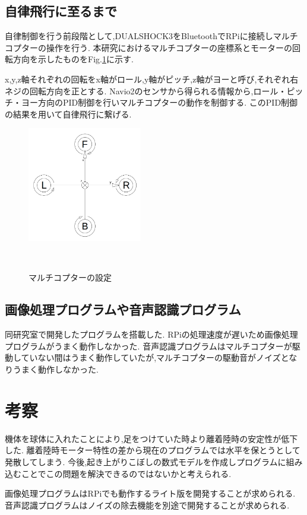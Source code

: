 \documentclass[a4paper]{jarticle}
\begin{document}
\subsection{自律飛行に至るまで}
自律制御を行う前段階として,DUALSHOCK3をBluetoothでRPiに接続しマルチコプターの操作を行う.
本研究におけるマルチコプターの座標系とモーターの回転方向を示したものをFig.\ref{fig:config}に示す.

x,y,z軸それぞれの回転をx軸がロール,y軸がピッチ,z軸がヨーと呼び,それぞれ右ネジの回転方向を正とする.
Navio2のセンサから得られる情報から,ロール・ピッチ・ヨー方向のPID制御を行いマルチコプターの動作を制御する.
このPID制御の結果を用いて自律飛行に繋げる.

\begin{figure}[htbp]
 \begin{center}
  \includegraphics[width=50mm]{image/config.png}
 　\caption{マルチコプターの設定}
 　\label{fig:config}
 \end{center}
\end{figure}

\subsection{画像処理プログラムや音声認識プログラム}
同研究室で開発したプログラムを搭載した.
RPiの処理速度が遅いため画像処理プログラムがうまく動作しなかった.
音声認識プログラムはマルチコプターが駆動していない間はうまく動作していたが,マルチコプターの駆動音がノイズとなりうまく動作しなかった.

\section{考察}
機体を球体に入れたことにより,足をつけていた時より離着陸時の安定性が低下した.
離着陸時モーター特性の差から現在のプログラムでは水平を保とうとして発散してしまう.
今後,起き上がりこぼしの数式モデルを作成しプログラムに組み込むことでこの問題を解決できるのではないかと考えられる.

画像処理プログラムはRPiでも動作するライト版を開発することが求められる.
音声認識プログラムはノイズの除去機能を別途で開発することが求められる.
\end{document}
